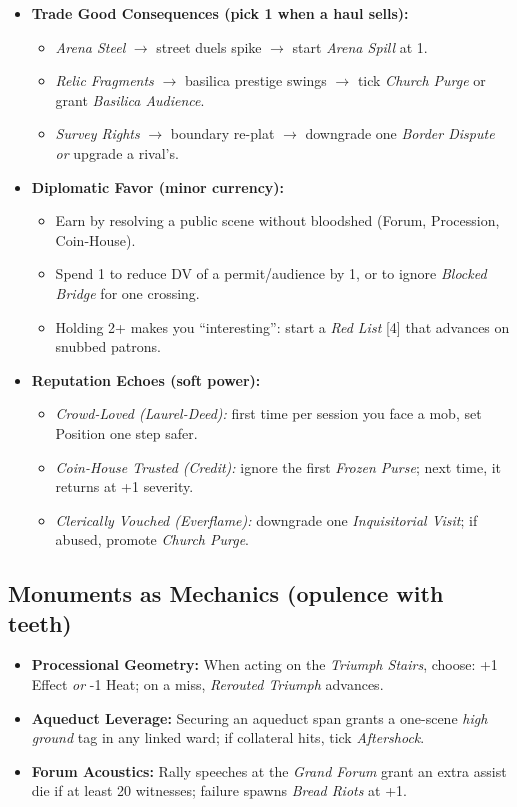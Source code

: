 \begin{itemize}
  \item \textbf{Trade Good Consequences (pick 1 when a haul sells):}
  \begin{itemize}
    \item \emph{Arena Steel} $\rightarrow$ street duels spike $\rightarrow$ start \emph{Arena Spill} at 1.
    \item \emph{Relic Fragments} $\rightarrow$ basilica prestige swings $\rightarrow$ tick \emph{Church Purge} or grant \emph{Basilica Audience}.
    \item \emph{Survey Rights} $\rightarrow$ boundary re-plat $\rightarrow$ downgrade one \emph{Border Dispute} \emph{or} upgrade a rival’s.
  \end{itemize}

  \item \textbf{Diplomatic Favor (minor currency):}
  \begin{itemize}
    \item Earn by resolving a public scene without bloodshed (Forum, Procession, Coin-House).
    \item Spend 1 to reduce DV of a permit/audience by 1, or to ignore \emph{Blocked Bridge} for one crossing.
    \item Holding 2+ makes you “interesting”: start a \emph{Red List} [4] that advances on snubbed patrons.
  \end{itemize}

  \item \textbf{Reputation Echoes (soft power):}
  \begin{itemize}
    \item \emph{Crowd-Loved (Laurel-Deed):} first time per session you face a mob, set Position one step safer.
    \item \emph{Coin-House Trusted (Credit):} ignore the first \emph{Frozen Purse}; next time, it returns at +1 severity.
    \item \emph{Clerically Vouched (Everflame):} downgrade one \emph{Inquisitorial Visit}; if abused, promote \emph{Church Purge}.
  \end{itemize}
\end{itemize}

\subsection*{Monuments as Mechanics (opulence with teeth)}
\begin{itemize}
  \item \textbf{Processional Geometry:} When acting on the \emph{Triumph Stairs}, choose: +1 Effect \emph{or} -1 Heat; on a miss, \emph{Rerouted Triumph} advances.
  \item \textbf{Aqueduct Leverage:} Securing an aqueduct span grants a one-scene \emph{high ground} tag in any linked ward; if collateral hits, tick \emph{Aftershock}.
  \item \textbf{Forum Acoustics:} Rally speeches at the \emph{Grand Forum} grant an extra assist die if at least 20 witnesses; failure spawns \emph{Bread Riots} at +1.
\end{itemize}

